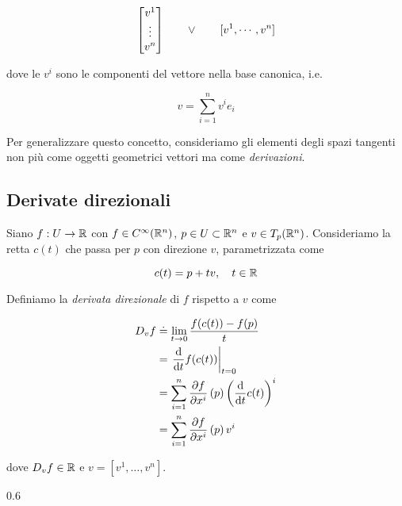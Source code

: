 \begin{equation}
	\bmqty{ v^{1} \\ \vdots \\ v^{n} } \qquad \lor \qquad [v^{1}, \cdots, v^{n}]
\end{equation}

dove le $ v^{i} $ sono le componenti del vettore nella base canonica, i.e.

\begin{equation}
	v = \sum_{i=1}^{n} v^{i} e_{i}
\end{equation}

Per generalizzare questo concetto, consideriamo gli elementi degli spazi tangenti non più come oggetti geometrici vettori ma come \textit{derivazioni}.

\subsection{Derivate direzionali}

Siano $ f : U \to \mathbb{R} $ con $ f \in C^{\infty}(\mathbb{R}^{n}) $, $ p\in U \subset \mathbb{R}^{n} $ e $ v \in T_{p}(\mathbb{R}^{n}) $. Consideriamo la retta $ c(t) $ che passa per $ p $ con direzione $ v $, parametrizzata come

\begin{equation}
	c(t) = p + t v \qcomma t \in \R
\end{equation}

Definiamo la \textit{derivata direzionale} di $ f $ rispetto a $ v $ come

\begin{align}
	\begin{split}
		D_{v} f &\doteq \lim_{t \to 0} \dfrac{f(c(t)) - f(p)}{t}\\
		&= \left. \dv{t} f(c(t)) \right|_{t=0}\\
		&= \sum_{i=1}^{n} \pdv{f}{x^{i}} \, (p) \left( \dv{t} c(t) \right)^{i}\\
		&= \sum_{i=1}^{n} \pdv{f}{x^{i}} \, (p) \, v^{i}
	\end{split}
\end{align}

dove $ D_{v} f \in \mathbb{R} $ e $ v = [v^{1},\dots,v^{n}] $.

	{0.6}{%
			}

